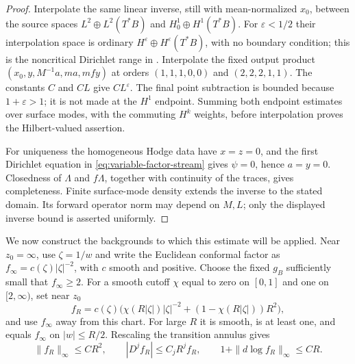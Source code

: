 \documentclass[11pt]{amsart}
\theoremstyle{definition}
\theoremstyle{remark}
\theoremstyle{plain}
\begin{document}
\begin{proof}
Interpolate the same linear inverse, still with mean-normalized
$x_0$, between the source spaces
$L^2\oplus L^2(T^*B)$ and $H^1_0\oplus H^1(T^*B)$.
For $\varepsilon<1/2$ their interpolation space is ordinary
$H^\varepsilon\oplus H^\varepsilon(T^*B)$, with no boundary
condition; this is the noncritical Dirichlet range in
\cite[Definition~2.1 and Theorem~2.2]{Grubb16}.
Interpolate the fixed output product
$(x_0,y,M^{-1}a,ma,mf y)$ at orders $(1,1,1,0,0)$ and
$(2,2,2,1,1)$. The constants $C$ and $CL$ give $CL^\varepsilon$.
The final point subtraction is bounded because $1+\varepsilon>1$;
it is not made at the $H^1$ endpoint. Summing both endpoint
estimates over surface modes, with the commuting $H^k$ weights,
before interpolation proves the Hilbert-valued assertion.

For uniqueness the homogeneous Hodge data have $x=z=0$, and
the first Dirichlet equation in
\eqref{eq:variable-factor-stream} gives $\psi=0$, hence $a=y=0$.
Closedness of $\Lambda$ and $f\Lambda$, together with continuity
of the traces, gives completeness. Finite surface-mode density
extends the inverse to the stated domain. Its forward operator
norm may depend on $M,L$; only the displayed inverse bound is
asserted uniformly.
\end{proof}

We now construct the backgrounds to which this estimate will be
applied. Near $z_0=\infty$, use $\zeta=1/w$ and write the
Euclidean conformal factor as $f_\infty=c(\zeta)|\zeta|^{-2}$,
with $c$ smooth and positive. Choose the fixed $g_B$ sufficiently
small that $f_\infty\geq2$. For a smooth cutoff $\chi$ equal to
zero on $[0,1]$ and one on $[2,\infty)$, set near $z_0$
\begin{equation}\label{eq:euclidean-cap-factor}
 f_R=c(\zeta)\bigl(\chi(R|\zeta|)|\zeta|^{-2}
                       +(1-\chi(R|\zeta|))R^2\bigr),
\end{equation}
and use $f_\infty$ away from this chart. For large $R$ it is
smooth, is at least one, and equals $f_\infty$ on $|w|\leq R/2$.
Rescaling the transition annulus gives
\begin{equation}\label{eq:euclidean-cap-bounds}
 \|f_R\|_\infty\leq CR^2,\qquad
 |D^j f_R|\leq C_jR^j f_R,\qquad
 1+\|d\log f_R\|_\infty\leq CR.
\end{equation}
\end{document}
